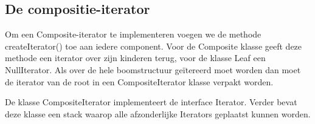 \documentclass[a4paper,12pt]{article}
\begin{document}
\subsection{De compositie-iterator}
Om een Composite-iterator te implementeren voegen we de methode createIterator() toe aan iedere component.
Voor de Composite klasse geeft deze methode een iterator over zijn kinderen terug, voor de klasse Leaf een NullIterator. Als over de hele boomstructuur geïtereerd moet worden dan moet de iterator van de root in een CompositeIterator klasse verpakt worden.

De klasse CompositeIterator implementeert de interface Iterator.
Verder bevat deze klasse een stack waarop alle afzonderlijke Iterators geplaatst kunnen worden.
\end{document}
